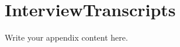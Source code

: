 \chapter{InterviewTranscripts} \label{Appendix:InterviewTranscripts}

Write your appendix content here.